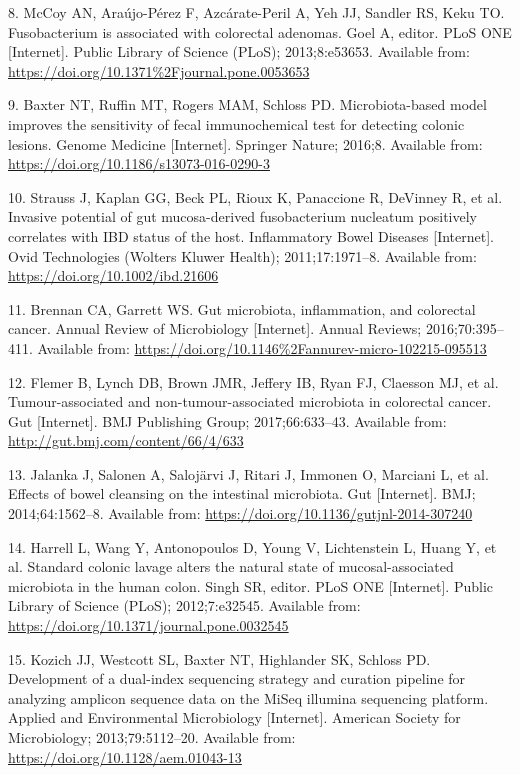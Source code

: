 \documentclass[12pt,]{article}
\begin{document}
\hypertarget{ref-McCoy_2013}{}
8. McCoy AN, Araújo-Pérez F, Azcárate-Peril A, Yeh JJ, Sandler RS, Keku
TO. Fusobacterium is associated with colorectal adenomas. Goel A,
editor. PLoS ONE {[}Internet{]}. Public Library of Science (PLoS);
2013;8:e53653. Available from:
\url{https://doi.org/10.1371\%2Fjournal.pone.0053653}

\hypertarget{ref-Baxter2016}{}
9. Baxter NT, Ruffin MT, Rogers MAM, Schloss PD. Microbiota-based model
improves the sensitivity of fecal immunochemical test for detecting
colonic lesions. Genome Medicine {[}Internet{]}. Springer Nature;
2016;8. Available from: \url{https://doi.org/10.1186/s13073-016-0290-3}

\hypertarget{ref-Strauss2011}{}
10. Strauss J, Kaplan GG, Beck PL, Rioux K, Panaccione R, DeVinney R, et
al. Invasive potential of gut mucosa-derived fusobacterium nucleatum
positively correlates with IBD status of the host. Inflammatory Bowel
Diseases {[}Internet{]}. Ovid Technologies (Wolters Kluwer Health);
2011;17:1971--8. Available from: \url{https://doi.org/10.1002/ibd.21606}

\hypertarget{ref-Brennan_2016}{}
11. Brennan CA, Garrett WS. Gut microbiota, inflammation, and colorectal
cancer. Annual Review of Microbiology {[}Internet{]}. Annual Reviews;
2016;70:395--411. Available from:
\url{https://doi.org/10.1146\%2Fannurev-micro-102215-095513}

\hypertarget{ref-Flemer633}{}
12. Flemer B, Lynch DB, Brown JMR, Jeffery IB, Ryan FJ, Claesson MJ, et
al. Tumour-associated and non-tumour-associated microbiota in colorectal
cancer. Gut {[}Internet{]}. BMJ Publishing Group; 2017;66:633--43.
Available from: \url{http://gut.bmj.com/content/66/4/633}

\hypertarget{ref-Jalanka2014}{}
13. Jalanka J, Salonen A, Salojärvi J, Ritari J, Immonen O, Marciani L,
et al. Effects of bowel cleansing on the intestinal microbiota. Gut
{[}Internet{]}. BMJ; 2014;64:1562--8. Available from:
\url{https://doi.org/10.1136/gutjnl-2014-307240}

\hypertarget{ref-Harrell2012}{}
14. Harrell L, Wang Y, Antonopoulos D, Young V, Lichtenstein L, Huang Y,
et al. Standard colonic lavage alters the natural state of
mucosal-associated microbiota in the human colon. Singh SR, editor. PLoS
ONE {[}Internet{]}. Public Library of Science (PLoS); 2012;7:e32545.
Available from: \url{https://doi.org/10.1371/journal.pone.0032545}

\hypertarget{ref-Kozich2013}{}
15. Kozich JJ, Westcott SL, Baxter NT, Highlander SK, Schloss PD.
Development of a dual-index sequencing strategy and curation pipeline
for analyzing amplicon sequence data on the MiSeq illumina sequencing
platform. Applied and Environmental Microbiology {[}Internet{]}.
American Society for Microbiology; 2013;79:5112--20. Available from:
\url{https://doi.org/10.1128/aem.01043-13}
\end{document}
